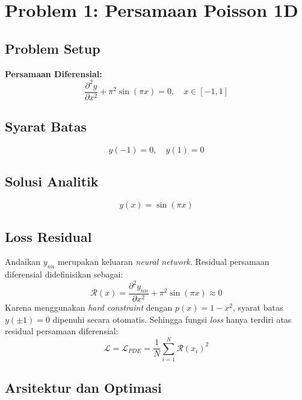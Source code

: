 \documentclass[12pt, letterpaper]{article}
\begin{document}
\section{Problem 1: Persamaan Poisson 1D}

\subsection{Problem Setup}

\textbf{Persamaan Diferensial:}
\begin{equation}
    \frac{\partial^2 y}{\partial x^2} + \pi^2 \sin(\pi x) = 0, \quad x \in [-1, 1]
\end{equation}

\subsection{Syarat Batas}
\begin{equation}
    y(-1) = 0, \quad y(1) = 0
\end{equation}

\subsection{Solusi Analitik}
\begin{equation}
    y(x) = \sin(\pi x)
\end{equation}

\subsection{Loss Residual}

Andaikan $y_{nn}$ merupakan keluaran \textit{neural network}. Residual
persamaan diferensial didefinisikan sebagai:
\begin{equation}
    \mathcal{R}(x) = \frac{\partial^2 y_{nn}}{\partial x^2} + \pi^2 \sin(\pi x) \approx 0
\end{equation}
Karena menggunakan \textit{hard constraint} dengan $p(x) = 1 - x^2$, syarat
batas $y(\pm 1) = 0$ dipenuhi secara otomatis. Sehingga fungsi \textit{loss}
hanya terdiri atas residual persamaan diferensial:
\begin{equation}
    \mathcal{L} = \mathcal{L}_{PDE} = \frac{1}{N} \sum_{i=1}^{N} \mathcal{R}(x_i)^2
\end{equation}

\subsection{Arsitektur dan Optimasi}
\end{document}
